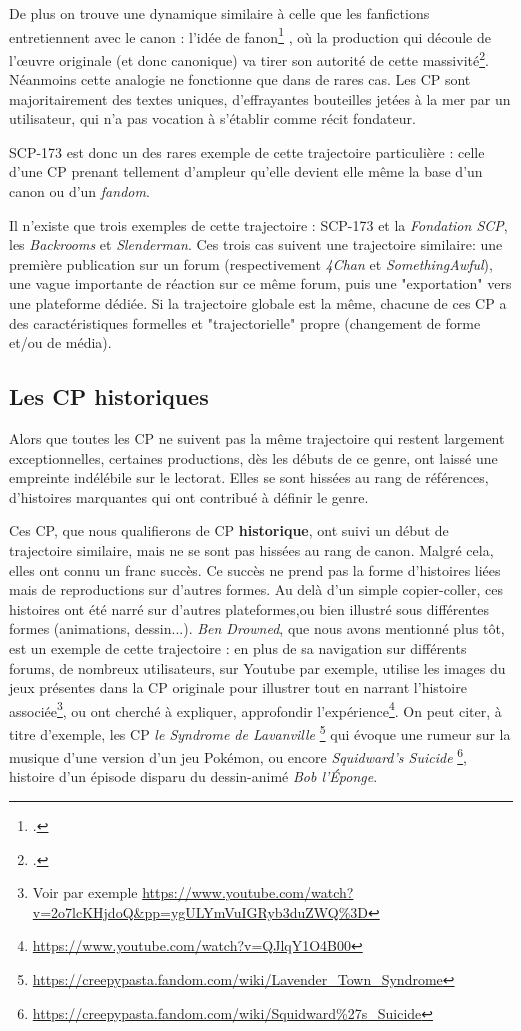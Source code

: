 \documentclass[12pt,a4paper,oneside,titlepage]{book} %
\begin{document}
	De plus on trouve une dynamique similaire à celle que les fanfictions entretiennent avec le canon : l'idée de fanon\footcite{lata_du_2022} , où la production qui découle de l'œuvre originale (et donc canonique) va tirer son autorité de cette massivité\footcite{cook_canonicity_2013}. 
	Néanmoins cette analogie ne fonctionne que dans de rares cas. Les CP sont majoritairement des textes uniques, d'effrayantes bouteilles jetées à la mer par un utilisateur, qui n'a pas vocation à s'établir comme récit fondateur. 
	
	SCP-173 est donc un des rares exemple de cette trajectoire particulière : celle d'une CP prenant tellement d'ampleur qu'elle devient elle même la base d'un canon ou d'un \textit{fandom}. 

	
	Il n'existe que trois exemples de cette trajectoire : SCP-173 et la \emph{Fondation SCP}, les \emph{Backrooms} et \emph{Slenderman}. 
	Ces trois cas suivent une trajectoire similaire: une première publication sur un forum (respectivement \emph{4Chan} et \emph{SomethingAwful}), une vague importante de réaction sur ce même forum, puis une "exportation" vers une plateforme dédiée. Si la trajectoire globale est la même, chacune de ces CP a des caractéristiques formelles et "trajectorielle" propre (changement de forme et/ou de média).
	
	\subsection{Les CP historiques}
	
	Alors que toutes les CP ne suivent pas la même trajectoire qui restent largement exceptionnelles, certaines productions, dès les débuts de ce genre, ont laissé une empreinte indélébile sur le lectorat. Elles se sont hissées au rang de références, d'histoires marquantes qui ont contribué à définir le genre. 
	
	Ces CP, que nous qualifierons de CP \textbf{historique}, ont suivi un début de trajectoire similaire, mais ne se sont pas hissées au rang de canon. Malgré cela, elles ont connu un franc succès. Ce succès ne prend pas la forme d'histoires liées mais de reproductions sur d'autres formes. Au delà d'un simple copier-coller, ces histoires ont été narré sur d'autres plateformes,ou bien illustré sous différentes formes (animations, dessin...). 
	\textit{Ben Drowned}, que nous avons mentionné plus tôt, est un exemple de cette trajectoire : en plus de sa navigation sur différents forums, de nombreux utilisateurs, sur Youtube par exemple, utilise les images du jeux présentes dans la CP originale pour illustrer tout en narrant l'histoire associée\footnote{Voir par exemple \url{https://www.youtube.com/watch?v=2o7lcKHjdoQ\&pp=ygULYmVuIGRyb3duZWQ\%3D}}, ou ont cherché à expliquer, approfondir l'expérience\footnote{\url{https://www.youtube.com/watch?v=QJlqY1O4B00}}.
	On peut citer, à titre d'exemple, les CP \emph{le Syndrome de Lavanville} \footnote{\url{https://creepypasta.fandom.com/wiki/Lavender_Town_Syndrome}} qui évoque une rumeur sur la musique d'une version d'un jeu Pokémon, ou encore \emph{Squidward's Suicide} \footnote{\url{https://creepypasta.fandom.com/wiki/Squidward\%27s_Suicide}}, histoire d'un épisode disparu du dessin-animé \emph{Bob l'Éponge}.
\end{document}
